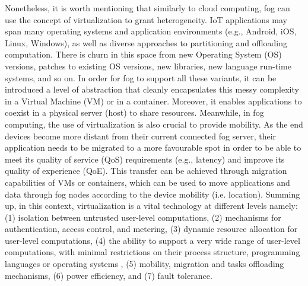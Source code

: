 \noindent\tab Nonetheless, it is worth mentioning that similarly to cloud computing, fog can use the concept of virtualization to grant heterogeneity. IoT applications may span many operating systems and application environments (e.g., Android, iOS, Linux, Windows), as well as diverse approaches to partitioning and offloading computation. There is churn in this space from new Operating System (OS) versions, patches to existing OS versions, new libraries, new language run-time systems, and so on. In order for fog to support all these variants, it can be introduced a level of abstraction that cleanly encapsulates this messy complexity in a Virtual Machine (VM) or in a container. Moreover, it enables applications to coexist in a physical server (host) to share resources. Meanwhile, in fog computing, the use of virtualization is also crucial to provide mobility. As the end devices become more distant from their current connected fog server, their application needs to be migrated to a more favourable spot in order to be able to meet its quality of service (QoS) requirements (e.g., latency) and improve its quality of experience (QoE). This transfer can be achieved through migration capabilities of VMs or containers, which can be used to move applications and data through fog nodes according to the device mobility (i.e. location). Summing up, in this context, virtualization is a vital technology at different levels namely: (1) isolation between untrusted user-level computations, (2) mechanisms for authentication, access control, and metering, (3) dynamic resource allocation for user-level computations, (4) the ability to support a very wide range of user-level computations, with minimal restrictions on their process structure, programming languages or operating systems \cite{Cloudlet83:online}, (5) mobility, migration and tasks offloading mechanisms, (6) power efficiency, and (7) fault tolerance.\\

